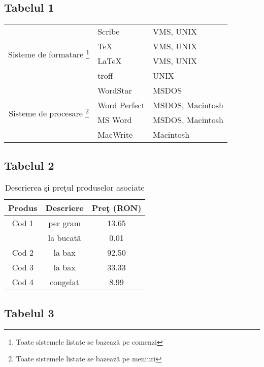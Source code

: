 \documentclass{article}
\begin{document}
\subsection*{Tabelul 1}

\begin{minipage}{\textwidth}
	\begin{center}
		\begin{tabular}{|c|l|l|}
		\hline
			\multirow{4}{*}{Sisteme de formatare \footnote{Toate sistemele listate se bazează pe comenzi}}&Scribe & VMS, UNIX\\
			& \TeX & VMS, UNIX\\
			& \LaTeX & VMS, UNIX\\
			& troff & UNIX\\
		\hline
			\multirow{4}{*}{Sisteme de procesare \footnote{Toate sistemele listate se bazează pe meniuri}}&WordStar & MSDOS\\
			& Word Perfect & MSDOS, Macintosh\\
			& MS Word & MSDOS, Macintosh\\
			& MacWrite & Macintosh\\
		\hline
		\end{tabular}
	\end{center}
\end{minipage}

\renewcommand{\tablename}{Tabelul}

\subsection*{Tabelul 2}

\begin{table}[htbp]
	\centering
	\begin{tabular}{c c c}
		\textbf{Produs} & \textbf{Descriere} & \textbf{Preţ (RON)} \\
		\hline
		Cod 1 & per gram & 13.65 \\
		& la bucată & 0.01 \\
		Cod 2 & la bax & 92.50 \\
		Cod 3 & la bax & 33.33 \\
		Cod 4 & congelat & 8.99 \\
		\hline
	\end{tabular}
	\caption{Descrierea şi preţul produselor asociate}
	\label{tabel2}
\end{table}

\subsection*{Tabelul 3}
\end{document}
